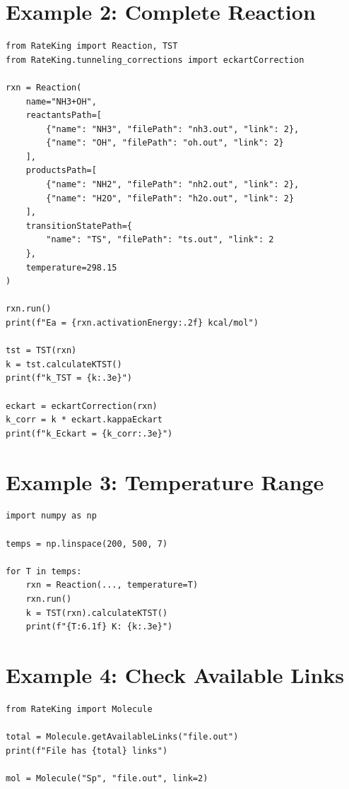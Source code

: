 \documentclass[11pt,a4paper]{book}
\begin{document}
\section{Example 2: Complete Reaction}

\begin{lstlisting}
from RateKing import Reaction, TST
from RateKing.tunneling_corrections import eckartCorrection

rxn = Reaction(
    name="NH3+OH",
    reactantsPath=[
        {"name": "NH3", "filePath": "nh3.out", "link": 2},
        {"name": "OH", "filePath": "oh.out", "link": 2}
    ],
    productsPath=[
        {"name": "NH2", "filePath": "nh2.out", "link": 2},
        {"name": "H2O", "filePath": "h2o.out", "link": 2}
    ],
    transitionStatePath={
        "name": "TS", "filePath": "ts.out", "link": 2
    },
    temperature=298.15
)

rxn.run()
print(f"Ea = {rxn.activationEnergy:.2f} kcal/mol")

tst = TST(rxn)
k = tst.calculateKTST()
print(f"k_TST = {k:.3e}")

eckart = eckartCorrection(rxn)
k_corr = k * eckart.kappaEckart
print(f"k_Eckart = {k_corr:.3e}")
\end{lstlisting}

\section{Example 3: Temperature Range}

\begin{lstlisting}
import numpy as np

temps = np.linspace(200, 500, 7)

for T in temps:
    rxn = Reaction(..., temperature=T)
    rxn.run()
    k = TST(rxn).calculateKTST()
    print(f"{T:6.1f} K: {k:.3e}")
\end{lstlisting}

\section{Example 4: Check Available Links}

\begin{lstlisting}
from RateKing import Molecule

total = Molecule.getAvailableLinks("file.out")
print(f"File has {total} links")

mol = Molecule("Sp", "file.out", link=2)
\end{lstlisting}
\end{document}
